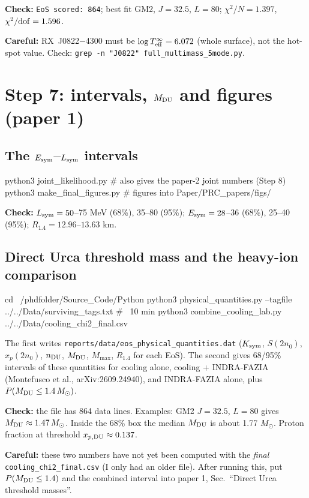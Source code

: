 \documentclass[11pt,a4paper]{article}
\newcommand{\Esym}{E_{\rm sym}}
\newcommand{\Lsym}{L_{\rm sym}}
\newcommand{\Msun}{M_\odot}
\newcommand{\f}[1]{\texttt{#1}}
\newcommand{\ok}[1]{\par\noindent\textcolor{okc}{\textbf{Check:}} #1\par}
\newcommand{\warn}[1]{\par\noindent\textcolor{warnc}{\textbf{Careful:}} #1\par}
\begin{document}
\ok{\f{EoS scored: 864}; best fit GM2, $J=32.5$, $L=80$; $\chi^2/N=1.397$, $\chi^2/{\rm dof}=1.596$.}
\warn{RX~J0822$-$4300 must be $\log T_{\rm eff}^\infty=6.072$ (whole surface), not the hot-spot value. Check: \f{grep -n "J0822" full\_multimass\_5mode.py}.}

\section{Step 7: intervals, $M_{\rm DU}$ and figures (paper 1)}
\subsection{The $\Esym$--$\Lsym$ intervals}
\begin{cmd}
python3 joint_likelihood.py      # also gives the paper-2 joint numbers (Step 8)
python3 make_final_figures.py    # figures into Paper/PRC_papers/figs/
\end{cmd}
\ok{$\Lsym=50$--75 MeV (68\%), 35--80 (95\%); $\Esym=28$--36 (68\%), 25--40 (95\%); $R_{1.4}=12.96$--$13.63$ km.}

\subsection{Direct Urca threshold mass and the heavy-ion comparison}
\begin{cmd}
cd ~/phdfolder/Source_Code/Python
python3 physical_quantities.py --tagfile ../../Data/surviving_tags.txt   # ~10 min
python3 combine_cooling_lab.py ../../Data/cooling_chi2_final.csv
\end{cmd}
The first writes \f{reports/data/eos\_physical\_quantities.dat} ($K_{\rm sym}$, $S(2n_0)$, $x_p(2n_0)$, $n_{\rm DU}$, $M_{\rm DU}$, $M_{\max}$, $R_{1.4}$ for each EoS). The second gives 68/95\% intervals of these quantities for cooling alone, cooling + INDRA-FAZIA (Montefusco et al., arXiv:2609.24940), and INDRA-FAZIA alone, plus $P(M_{\rm DU}\le1.4\,\Msun)$.

\ok{the file has 864 data lines. Examples: GM2 $J=32.5$, $L=80$ gives $M_{\rm DU}\approx1.47\,\Msun$. Inside the 68\% box the median $M_{\rm DU}$ is about 1.77 $\Msun$. Proton fraction at threshold $x_{p,\rm DU}\approx0.137$.}
\warn{these two numbers have not yet been computed with the \emph{final} \f{cooling\_chi2\_final.csv} (I only had an older file). After running this, put $P(M_{\rm DU}\le1.4)$ and the combined interval into paper 1, Sec.~``Direct Urca threshold masses''.}
\end{document}
